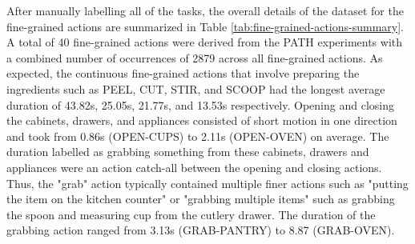 After manually labelling all of the tasks, the overall details of the dataset for the fine-grained actions are summarized in Table \ref{tab:fine-grained-actions-summary}. A total of 40 fine-grained actions were derived from the PATH experiments with a combined number of occurrences of 2879 across all fine-grained actions. As expected, the continuous fine-grained actions that involve preparing the ingredients such as PEEL, CUT, STIR, and SCOOP had the longest average duration of 43.82s, 25.05s, 21.77s, and 13.53s respectively. Opening and closing the cabinets, drawers, and appliances consisted of short motion in one direction and took from 0.86s (OPEN-CUPS) to 2.11s (OPEN-OVEN) on average. The duration labelled as grabbing something from these cabinets, drawers and appliances were an action catch-all between the opening and closing actions. Thus, the "grab" action typically contained multiple finer actions such as "putting the item on the kitchen counter" or "grabbing multiple items" such as grabbing the spoon and measuring cup from the cutlery drawer. The duration of the grabbing action ranged from 3.13s (GRAB-PANTRY) to 8.87 (GRAB-OVEN).


